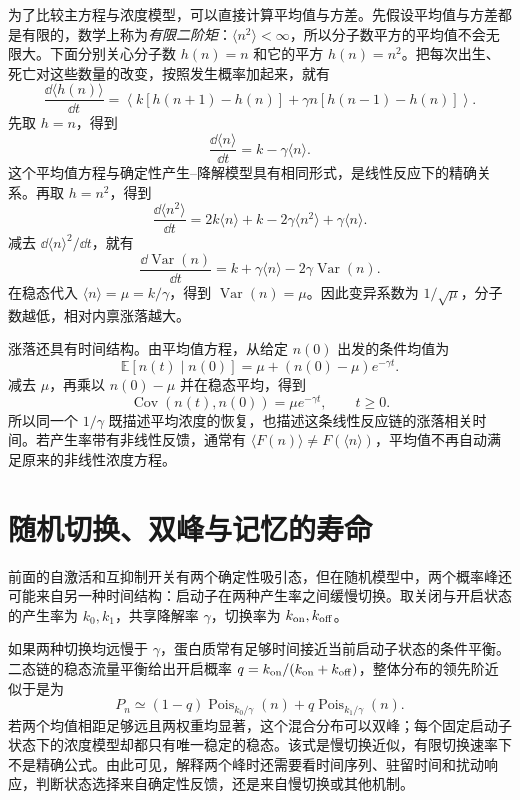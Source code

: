 为了比较主方程与浓度模型，可以直接计算平均值与方差。先假设平均值与方差都是有限的，数学上称为\emph{有限二阶矩}：$\langle n^2\rangle<\infty$，所以分子数平方的平均值不会无限大。下面分别关心分子数 $h(n)=n$ 和它的平方 $h(n)=n^2$。把每次出生、死亡对这些数量的改变，按照发生概率加起来，就有
\[
\frac{\dd\langle h(n)\rangle}{\dd t}
=\left\langle k[h(n+1)-h(n)]+\gamma n[h(n-1)-h(n)]\right\rangle.
\]
先取 $h=n$，得到
\begin{equation}\frac{\dd\langle n\rangle}{\dd t}=k-\gamma\langle n\rangle.\end{equation}
这个平均值方程与确定性产生--降解模型具有相同形式，是线性反应下的精确关系。再取 $h=n^2$，得到
\[
\frac{\dd\langle n^2\rangle}{\dd t}=2k\langle n\rangle+k-2\gamma\langle n^2\rangle+\gamma\langle n\rangle.
\]
减去 $\dd\langle n\rangle^2/\dd t$，就有
\begin{equation}\frac{\dd\operatorname{Var}(n)}{\dd t}=k+\gamma\langle n\rangle-2\gamma\operatorname{Var}(n).\end{equation}
在稳态代入 $\langle n\rangle=\mu=k/\gamma$，得到 $\operatorname{Var}(n)=\mu$。因此变异系数为 $1/\sqrt\mu$，分子数越低，相对内禀涨落越大。

涨落还具有时间结构。由平均值方程，从给定 $n(0)$ 出发的条件均值为
\[
\mathbb E[n(t)\mid n(0)]=\mu+(n(0)-\mu)e^{-\gamma t}.
\]
减去 $\mu$，再乘以 $n(0)-\mu$ 并在稳态平均，得到
\begin{equation}\operatorname{Cov}(n(t),n(0))=\mu e^{-\gamma t},\qquad t\geq0.\end{equation}
所以同一个 $1/\gamma$ 既描述平均浓度的恢复，也描述这条线性反应链的涨落相关时间。若产生率带有非线性反馈，通常有 $\langle F(n)\rangle\ne F(\langle n\rangle)$，平均值不再自动满足原来的非线性浓度方程。

\section{随机切换、双峰与记忆的寿命}
前面的自激活和互抑制开关有两个确定性吸引态，但在随机模型中，两个概率峰还可能来自另一种时间结构：启动子在两种产生率之间缓慢切换。取关闭与开启状态的产生率为 $k_0,k_1$，共享降解率 $\gamma$，切换率为 $k_{\rm on},k_{\rm off}$。

如果两种切换均远慢于 $\gamma$，蛋白质常有足够时间接近当前启动子状态的条件平衡。二态链的稳态流量平衡给出开启概率 $q=k_{\rm on}/(k_{\rm on}+k_{\rm off})$，整体分布的领先阶近似于是为
\[
P_n\simeq(1-q)\operatorname{Pois}_{k_0/\gamma}(n)+q\operatorname{Pois}_{k_1/\gamma}(n).
\]
若两个均值相距足够远且两权重均显著，这个混合分布可以双峰；每个固定启动子状态下的浓度模型却都只有唯一稳定的稳态。该式是慢切换近似，有限切换速率下不是精确公式。由此可见，解释两个峰时还需要看时间序列、驻留时间和扰动响应，判断状态选择来自确定性反馈，还是来自慢切换或其他机制。

